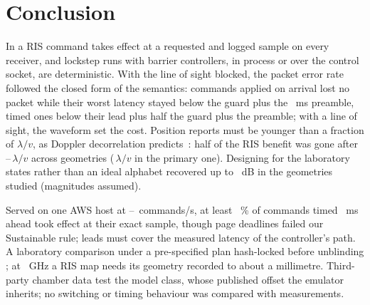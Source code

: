 \section{Conclusion}\label{sec:conclusion}

In \sremu{} a RIS command takes effect at a requested and logged sample on
every receiver, and lockstep runs with barrier controllers, in
process or over the control socket, are deterministic. With the line of sight blocked, the packet error rate followed
the closed form of the semantics: commands applied on arrival lost no packet while their worst
latency stayed below the guard plus the \numEbTpreMs~ms preamble, timed ones below their lead
plus half the guard plus the preamble; with a line of sight, the waveform set the cost.
Position reports must be younger than a fraction of $\lambda/v$, as Doppler
decorrelation predicts~\cite{Clarke1968,Jakes1974}: half of the RIS benefit was gone after
\numEaTauLambdaVMin--\numEaTauLambdaVMax\,$\lambda/v$ across geometries
(\numEaTauOverLambdaV\,$\lambda/v$ in the primary one). Designing for the laboratory
states rather than an ideal alphabet recovered up to \numEcDesignPenaltyMaxDb~dB in the geometries
studied (magnitudes assumed).

Served on one AWS host at
\numBfourRateLowHz--\numBfourRateMidHz~commands/s, at least \numBfourExactOkMinPct~\% of
commands timed \numBfourLeadOkMs~ms ahead took effect at their exact sample, though page
deadlines failed our Sustainable rule; leads must cover the measured latency of the
controller's path. A laboratory comparison
under a pre-specified plan hash-locked before unblinding \txtVLabOutcome;
at \numLabFreqGHz~GHz a RIS map needs its geometry recorded to about a
millimetre. Third-party chamber data test the model class, whose published
offset the emulator inherits; no switching or timing behaviour was compared with measurements.
